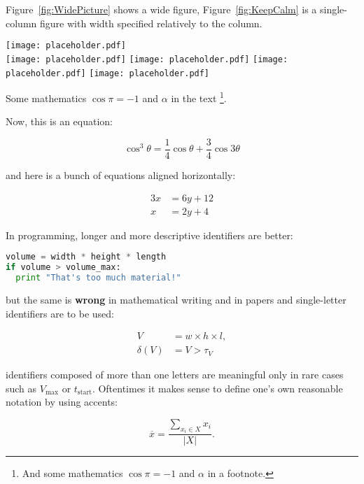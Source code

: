 \documentclass{ExcelAtFIT}
\begin{document}
Figure~\ref{fig:WidePicture} shows a wide figure, Figure~\ref{fig:KeepCalm} is a single-column figure with width specified relatively to the column.
\begin{figure*}[t]\centering %
  \centering
  \texttt{[image: placeholder.pdf]}\\[1pt]
  \texttt{[image: placeholder.pdf]}
  \texttt{[image: placeholder.pdf]}
  \texttt{[image: placeholder.pdf]}
  \texttt{[image: placeholder.pdf]}
  \caption{Wide Picture.  The whole figure can be composed of several smaller images.  If you want to address individual images in the caption or from the text, use the \textit{subcaption} package.}
  \label{fig:WidePicture}
\end{figure*}
Some mathematics $\cos\pi=-1$ and $\alpha$ in the text%
\footnote{And some mathematics $\cos\pi=-1$ and $\alpha$ in a footnote.}.

Now, this is an equation:
\begin{linenomath}
\begin{equation}
\cos^3 \theta =\frac{1}{4}\cos\theta+\frac{3}{4}\cos 3\theta
\label{eq:refname2}
\end{equation}
\end{linenomath}
and here is a bunch of equations aligned horizontally:
\begin{linenomath}
\begin{align}
	3x &= 6y + 12 \\
	x &= 2y + 4
\end{align}
\end{linenomath}

In programming, longer and more descriptive identifiers are better:
\begin{lstlisting}[language=Python]
volume = width * height * length
if volume > volume_max:
  print "That's too much material!"
\end{lstlisting}
but the same is \textbf{wrong} in mathematical writing and in papers and single-letter identifiers are to be used:
\begin{linenomath}
\begin{align}
V &= w \times h \times l, \\
\delta(V) &= V > \tau_V
\end{align}
\end{linenomath}
identifiers composed of more than one letters are meaningful only in rare cases such as $V_\mathrm{max}$ or $t_\mathrm{start}$.  Oftentimes it makes sense to define one's own reasonable notation by using accents:
\begin{linenomath}
\begin{equation}
  \overline{x} = \frac{\displaystyle\sum_{x_i \in X} x_i}{|X|} .
\end{equation}
\end{linenomath}
\end{document}
